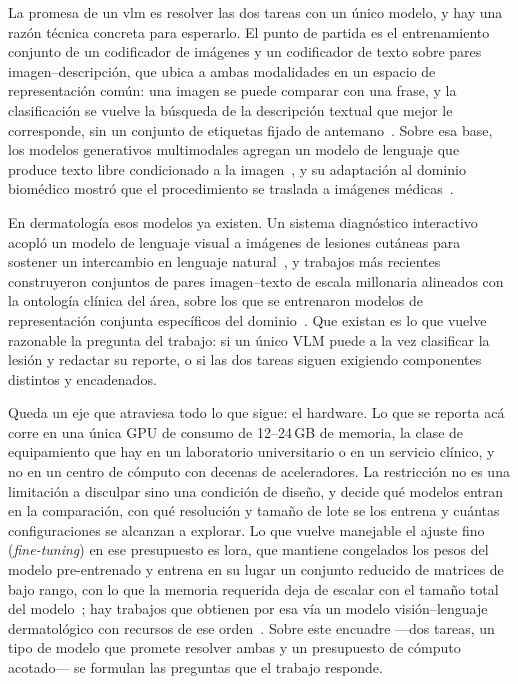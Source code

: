 

La promesa de un \gls{vlm} es resolver las dos tareas con un único modelo, y hay una razón técnica concreta
para esperarlo. El punto de partida es el entrenamiento conjunto de un codificador de imágenes y un
codificador de texto sobre pares imagen--descripción, que ubica a ambas modalidades en un espacio de
representación común: una imagen se puede comparar con una frase, y la clasificación se vuelve la búsqueda
de la descripción textual que mejor le corresponde, sin un conjunto de etiquetas fijado de
antemano~\cite{radford2021learning}. Sobre esa base, los modelos generativos multimodales agregan un modelo
de lenguaje que produce texto libre condicionado a la imagen~\cite{liu2023visual}, y su adaptación al
dominio biomédico mostró que el procedimiento se traslada a imágenes médicas~\cite{li2023llavamed}.

En dermatología esos modelos ya existen. Un sistema diagnóstico interactivo acopló un modelo de lenguaje
visual a imágenes de lesiones cutáneas para sostener un intercambio en lenguaje
natural~\cite{zhou2023skingpt4}, y trabajos más recientes construyeron conjuntos de pares imagen--texto de
escala millonaria alineados con la ontología clínica del área, sobre los que se entrenaron modelos de
representación conjunta específicos del dominio~\cite{yan2025derm1m}. Que existan es lo que vuelve razonable
la pregunta del trabajo: si un único VLM puede a la vez clasificar la lesión y redactar su reporte, o si las
dos tareas siguen exigiendo componentes distintos y encadenados.

Queda un eje que atraviesa todo lo que sigue: el hardware. Lo que se reporta acá corre en una única GPU de
consumo de 12--24\,GB de memoria, la clase de equipamiento que hay en un laboratorio universitario o en un
servicio clínico, y no en un centro de cómputo con decenas de aceleradores. La restricción no es una
limitación a disculpar sino una condición de diseño, y decide qué modelos entran en la comparación, con qué
resolución y tamaño de lote se los entrena y cuántas configuraciones se alcanzan a explorar. Lo que vuelve
manejable el ajuste fino (\emph{fine-tuning}) en ese presupuesto es \gls{lora}, que mantiene congelados los
pesos del modelo pre-entrenado y entrena en su lugar un conjunto reducido de matrices de bajo rango, con lo
que la memoria requerida deja de escalar con el tamaño total del modelo~\cite{hu2021lora}; hay trabajos que
obtienen por esa vía un modelo visión--lenguaje dermatológico con recursos de ese
orden~\cite{yilmaz2025resourceefficient}. Sobre este encuadre —dos tareas, un tipo de modelo que promete
resolver ambas y un presupuesto de cómputo acotado— se formulan las preguntas que el trabajo responde.
